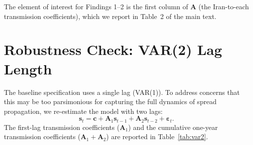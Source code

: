 \documentclass[12pt]{article}
\begin{document}
The element of interest for Findings 1--2 is the first column of $\mathbf{A}$ (the Iran-to-each transmission coefficients), which we report in Table~2 of the main text.



\section{Robustness Check: VAR(2) Lag Length}
\label{app:var2}

The baseline specification uses a single lag (VAR(1)). To address concerns that this may be too parsimonious for capturing the full dynamics of spread propagation, we re-estimate the model with two lags:
\begin{equation}
\mathbf{s}_t = \mathbf{c} + \mathbf{A}_1 \mathbf{s}_{t-1} + \mathbf{A}_2 \mathbf{s}_{t-2} + \boldsymbol{\varepsilon}_t.
\end{equation}
The first-lag transmission coefficients ($\mathbf{A}_1$) and the cumulative one-year transmission coefficients ($\mathbf{A}_1 + \mathbf{A}_2$) are reported in Table~\ref{tab:var2}.
\end{document}
